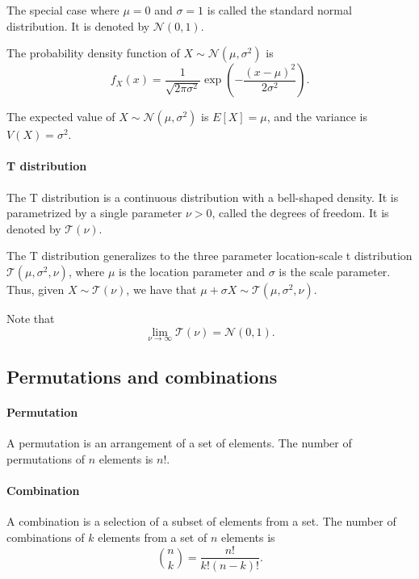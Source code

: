 The special case where $\mu = 0$ and $\sigma = 1$ is called the standard normal
distribution.  It is denoted by $\mathcal{N}(0, 1)$.

The probability density function of $X \sim \mathcal{N}(\mu, \sigma^2)$ is
\begin{equation}
  \label{eq:normal}
  f_X(x) = \frac{1}{\sqrt{2 \pi \sigma^2}} \exp\left(-\frac{(x - \mu)^2}{2 \sigma^2}\right)\text{.}
\end{equation}

The expected value of $X \sim \mathcal{N}(\mu, \sigma^2)$ is $E[X] = \mu$, and the
variance is $V(X) = \sigma^2$.

\paragraph{T distribution} The T distribution is a continuous distribution with a
bell-shaped density.  It is parametrized by a single parameter $\nu > 0$, called the
degrees of freedom.  It is denoted by $\mathcal{T}(\nu)$.


The T distribution generalizes to the three parameter location-scale t distribution
$\mathcal{T}(\mu, \sigma^2, \nu)$, where $\mu$ is the location parameter and $\sigma$ is
the scale parameter.  Thus, given $X \sim \mathcal{T}(\nu)$, we have that
$\mu + \sigma X \sim \mathcal{T}(\mu, \sigma^2, \nu)$.

Note that $$\lim_{\nu \rightarrow \infty} \mathcal{T}(\nu) = \mathcal{N}(0, 1)\text{.}$$

\subsection{Permutations and combinations}

\paragraph{Permutation}  A permutation is an arrangement of a set of elements.  The
number of permutations of $n$ elements is $n!$.

\paragraph{Combination}  A combination is a selection of a subset of elements from a
set.  The number of combinations of $k$ elements from a set of $n$ elements is
$$\binom{n}{k} = \frac{n!}{k!(n - k)!}\text{.}$$

